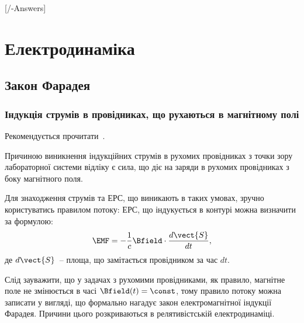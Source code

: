
[\currfilebase/\currfilebase-Answers]
\chapter{Електродинаміка}\label{\currfilebase}

\section{Закон Фарадея}



\subsection*{Індукція струмів в провідниках, що рухаються в магнітному полі}

\begin{Theory}\small
	Рекомендується прочитати~\cite[Глава 16, 17]{FLF6}.

	Причиною виникнення індукційних струмів в рухомих провідниках з точки зору лабораторної системи відліку є сила, що діє на заряди в рухомих провідниках з боку магнітного поля.

	Для знаходження струмів та ЕРС, що виникають в таких умовах, зручно користуватись правилом потоку: ЕРС, що індукується в контурі можна визначити за формулою:
	\begin{equation}
		\EMF = - \frac1c \Bfield \cdot \frac{d\vect{S}}{dt},
	\end{equation}
де $d\vect{S}$~-- площа, що замітається провідником за час $dt$.
\begin{Attention}
	Слід зауважити, що у задачах з рухомими провідниками, як правило, магнітне поле не змінюється в часі $\Bfield(t) = \const$, тому правило потоку можна записати у вигляді, що формально нагадує закон електромагнітної індукції Фарадея. Причини цього розкриваються в релятивістській електродинаміці.
\end{Attention}
\end{Theory}

